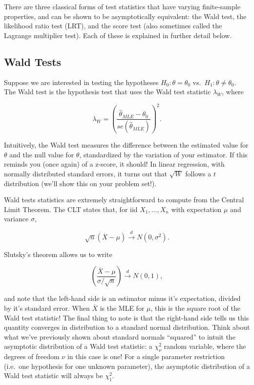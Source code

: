 \documentclass[
  letterpaper,
  DIV=11,
  numbers=noendperiod]{scrreprt}
\begin{document}
There are three classical forms of test statistics that have varying
finite-sample properties, and can be shown to be asymptotically
equivalent: the Wald test, the likelihood ratio test (LRT), and the
score test (also sometimes called the Lagrange multiplier test). Each of
these is explained in further detail below.

\subsection*{Wald Tests}\label{wald-tests}

Suppose we are interested in testing the hypotheses
\(H_0: \theta = \theta_0\) vs.~\(H_1: \theta \neq \theta_0\). The Wald
test is the hypothesis test that uses the Wald test statistic
\(\lambda_{W}\), where

\[
\lambda_W = \left( \frac{\hat{\theta}_{MLE} - \theta_0}{se(\hat{\theta}_{MLE})}\right)^2.
\]

Intuitively, the Wald test measures the difference between the estimated
value for \(\theta\) and the null value for \(\theta\), standardized by
the variation of your estimator. If this reminds you (once again) of a
z-score, it should! In linear regression, with normally distributed
standard errors, it turns out that \(\sqrt{W}\) follows a \(t\)
distribution (we'll show this on your problem set!).

Wald tests statistics are extremely straightforward to compute from the
Central Limit Theorem. The CLT states that, for iid \(X_1, \dots, X_n\)
with expectation \(\mu\) and variance \(\sigma\),

\[
\sqrt{n} (\overline{X} - \mu) \overset{d}{\to} N(0, \sigma^2).
\]

Slutsky's theorem allows us to write

\[
\left( \frac{\overline{X} - \mu}{\sigma / \sqrt{n}}\right) \overset{d}{\to} N(0,1),
\]

and note that the left-hand side is an estimator minus it's expectation,
divided by it's standard error. When \(\overline{X}\) is the MLE for
\(\mu\), this is the square root of the Wald test statistic! The final
thing to note is that the right-hand side tells us this quantity
converges in distribution to a standard normal distribution. Think about
what we've previously shown about standard normals ``squared'' to intuit
the asymptotic distribution of a Wald test statistic: a \(\chi^2_\nu\)
random variable, where the degrees of freedom \(\nu\) in this case is
one! For a single parameter restriction (i.e.~one hypothesis for one
unknown parameter), the asymptotic distribution of a Wald test statistic
will always be \(\chi^2_1\).
\end{document}
